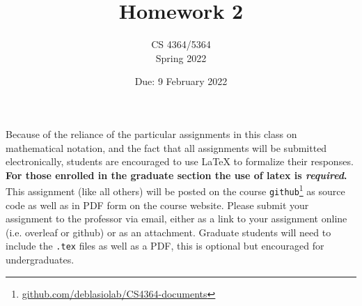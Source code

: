 \documentclass[11pt, oneside]{article}   	%
\title{Homework 2}
\author{CS 4364/5364\\Spring 2022}
\date{Due: 9 February 2022}							%
\begin{document}
\maketitle

Because of the reliance of the particular assignments in this class on mathematical notation, 
and the fact that all assignments will be submitted electronically, 
students are encouraged to use \LaTeX{} to formalize their responses. 
\textbf{For those enrolled in the graduate section the use of latex is \emph{required}.}
This assignment (like all others) will be posted on the course \texttt{github}\footnote{\url{github.com/deblasiolab/CS4364-documents}} as source code as well as in PDF form on the course website. 
Please submit your assignment to the professor via email, either as a link to your assignment online (i.e. overleaf or github) or as an attachment. 
Graduate students will need to include the \texttt{.tex} files as well as a PDF, this is optional but encouraged for undergraduates. 
\end{document}
